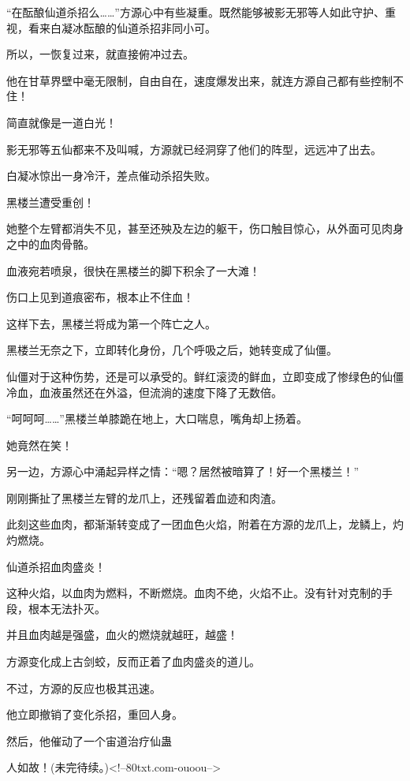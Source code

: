 \begin{this_body}
“在酝酿仙道杀招么……”方源心中有些凝重。既然能够被影无邪等人如此守护、重视，看来白凝冰酝酿的仙道杀招非同小可。

所以，一恢复过来，就直接俯冲过去。

他在甘草界壁中毫无限制，自由自在，速度爆发出来，就连方源自己都有些控制不住！

简直就像是一道白光！

影无邪等五仙都来不及叫喊，方源就已经洞穿了他们的阵型，远远冲了出去。

白凝冰惊出一身冷汗，差点催动杀招失败。

黑楼兰遭受重创！

她整个左臂都消失不见，甚至还殃及左边的躯干，伤口触目惊心，从外面可见肉身之中的血肉骨骼。

血液宛若喷泉，很快在黑楼兰的脚下积余了一大滩！

伤口上见到道痕密布，根本止不住血！

这样下去，黑楼兰将成为第一个阵亡之人。

黑楼兰无奈之下，立即转化身份，几个呼吸之后，她转变成了仙僵。

仙僵对于这种伤势，还是可以承受的。鲜红滚烫的鲜血，立即变成了惨绿色的仙僵冷血，血液虽然还在外溢，但流淌的速度下降了无数倍。

“呵呵呵……”黑楼兰单膝跪在地上，大口喘息，嘴角却上扬着。

她竟然在笑！

另一边，方源心中涌起异样之情：“嗯？居然被暗算了！好一个黑楼兰！”

刚刚撕扯了黑楼兰左臂的龙爪上，还残留着血迹和肉渣。

此刻这些血肉，都渐渐转变成了一团血色火焰，附着在方源的龙爪上，龙鳞上，灼灼燃烧。

仙道杀招血肉盛炎！

这种火焰，以血肉为燃料，不断燃烧。血肉不绝，火焰不止。没有针对克制的手段，根本无法扑灭。

并且血肉越是强盛，血火的燃烧就越旺，越盛！

方源变化成上古剑蛟，反而正着了血肉盛炎的道儿。

不过，方源的反应也极其迅速。

他立即撤销了变化杀招，重回人身。

然后，他催动了一个宙道治疗仙蛊

人如故！(未完待续。)<!--80txt.com-ouoou-->

\end{this_body}

